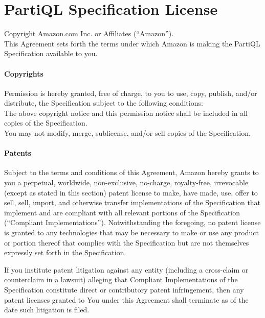\section*{PartiQL Specification License}

Copyright  Amazon.com Inc. or Affiliates (``Amazon''). \\

\noindent This Agreement sets forth the terms under which Amazon is making the
PartiQL Specification available to you.

\paragraph*{Copyrights}
\noindent Permission is hereby granted, free of charge, to you to use, copy,
publish, and/or distribute, the Specification subject to the following
conditions: \\

\noindent The above copyright notice and this permission notice shall be
included in all copies of the Specification. \\

\noindent You may not modify, merge, sublicense, and/or sell copies of the
Specification.

\paragraph*{Patents}
Subject to the terms and conditions of this Agreement, Amazon hereby grants to
you a perpetual, worldwide, non-exclusive, no-charge, royalty-free, irrevocable
(except as stated in this section) patent license to make, have made, use, offer
to sell, sell, import, and otherwise transfer implementations of the
Specification that implement and are compliant with all relevant portions of the
Specification (``Compliant Implementations''). Notwithstanding the foregoing, no
patent license is granted to any technologies that may be necessary to make or
use any product or portion thereof that complies with the Specification but are
not themselves expressly set forth in the Specification.

If you institute patent litigation against any entity (including a cross-claim
or counterclaim in a lawsuit) alleging that Compliant Implementations of the
Specification constitute direct or contributory patent infringement, then any
patent licenses granted to You under this Agreement shall terminate as of the
date such litigation is filed.\\

